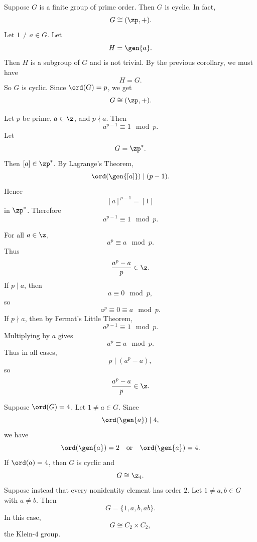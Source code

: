 \begin{corollary}{
    Suppose $G$ is a finite group of prime order.
    Then $G$ is cyclic.
    In fact,
    \[
        G\cong (\zp,+).
    \]
}
    Let $1\neq a\in G$.
    Let
    \[
        H=\gen{a}.
    \]
    Then $H$ is a subgroup of $G$ and is not trivial.
    By the previous corollary, we must have
    \[
        H=G.
    \]
    So $G$ is cyclic.
    Since $\ord(G)=p$, we get
    \[
        G\cong (\zp,+).
    \]
\end{corollary}

\begin{corollary}{
    Let $p$ be prime, $a\in\z$, and $p\nmid a$.
    Then
    \[
        a^{p-1}\equiv 1\mod p.
    \]
}
    Let
    \[
        G=\zp^*.
    \]
    Then $[a]\in \zp^*$.
    By Lagrange's Theorem,
    \[
        \ord(\gen{[a]})\mid (p-1).
    \]
    Hence
    \[
        [a]^{p-1}=[1]
    \]
    in $\zp^*$.
    Therefore
    \[
        a^{p-1}\equiv 1\mod p.
    \]
\end{corollary}

\begin{corollary}{
    For all $a\in\z$,
    \[
        a^p\equiv a\mod p.
    \]
    Thus
    \[
        \frac{a^p-a}{p}\in\z.
    \]
}
    If $p\mid a$, then
    \[
        a\equiv 0\mod p,
    \]
    so
    \[
        a^p\equiv 0\equiv a\mod p.
    \]
    If $p\nmid a$, then by Fermat's Little Theorem,
    \[
        a^{p-1}\equiv 1\mod p.
    \]
    Multiplying by $a$ gives
    \[
        a^p\equiv a\mod p.
    \]
    Thus in all cases,
    \[
        p\mid (a^p-a),
    \]
    so
    \[
        \frac{a^p-a}{p}\in\z.
    \]
\end{corollary}

\begin{example}
    Suppose $\ord(G)=4$.
    Let $1\neq a\in G$.
    Since
    \[
        \ord(\gen{a})\mid 4,
    \]
    we have
    \[
        \ord(\gen{a})=2
        \quad\text{or}\quad
        \ord(\gen{a})=4.
    \]
    If $\ord(a)=4$, then $G$ is cyclic and
    \[
        G\cong \z_4.
    \]
    Suppose instead that every nonidentity element has order $2$.
    Let $1\neq a,b\in G$ with $a\neq b$.
    Then
    \[
        G=\{1,a,b,ab\}.
    \]
    In this case,
    \[
        G\cong C_2\times C_2,
    \]
    the Klein-$4$ group.
\end{example}